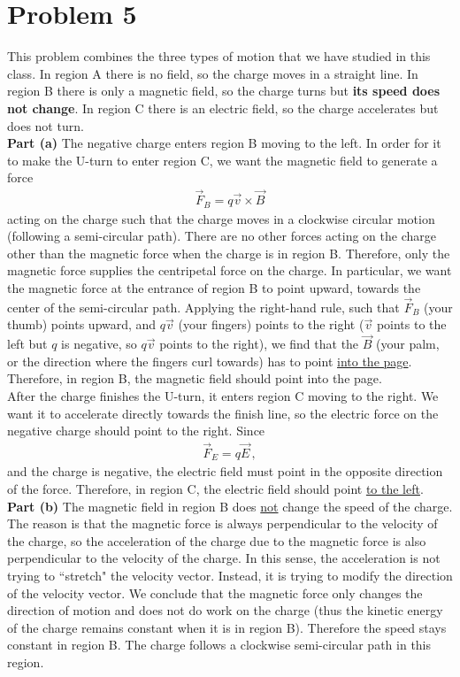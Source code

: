 \documentclass[11pt]{article}
\begin{document}
\section*{Problem 5}
This problem combines the three types of motion that we have studied in this class. In region A there is no field, so the charge moves in a straight line. In region B there is only a magnetic field, so the charge turns but \textbf{its speed does not change}. In region C there is an electric field, so the charge accelerates but does not turn.\\

\noindent\textbf{Part (a)} The negative charge enters region B moving to the left. In order for it to make the U-turn to enter region C, we want the magnetic field to generate a force
\begin{align*}
\vec{F}_B=q\vec{v}\times\vec{B}
\end{align*}
acting on the charge such that the charge moves in a clockwise circular motion (following a semi-circular path). There are no other forces acting on the charge other than the magnetic force when the charge is in region B. Therefore, only the magnetic force supplies the centripetal force on the charge. In particular, we want the magnetic force at the entrance of region B to point upward, towards the center of the semi-circular path. Applying the right-hand rule, such that $\vec{F}_B$ (your thumb) points upward, and $q\vec{v}$ (your fingers) points to the right ($\vec{v}$ points to the left but $q$ is negative, so $q\vec{v}$ points to the right), we find that the $\vec{B}$ (your palm, or the direction where the fingers curl towards) has to point \underline{into the page}. Therefore, in region B, the magnetic field should point into the page.\\

After the charge finishes the U-turn, it enters region C moving to the right. We want it to accelerate directly towards the finish line, so the electric force on the negative charge should point to the right. Since
\begin{align*}
\vec{F}_E=q\vec{E}\,,
\end{align*}
and the charge is negative, the electric field must point in the opposite direction of the force. Therefore, in region C, the electric field should point \underline{to the left}.\\

\noindent\textbf{Part (b)} The magnetic field in region B does \underline{not} change the speed of the charge. The reason is that the magnetic force is always perpendicular to the velocity of the charge, so the acceleration of the charge due to the magnetic force is also perpendicular to the velocity of the charge. In this sense, the acceleration is not trying to ``stretch" the velocity vector. Instead, it is trying to modify the direction of the velocity vector. We conclude that the magnetic force only changes the direction of motion and does not do work on the charge (thus the kinetic energy of the charge remains constant when it is in region B). Therefore the speed stays constant in region B. The charge follows a clockwise semi-circular path in this region.\\
\end{document}
